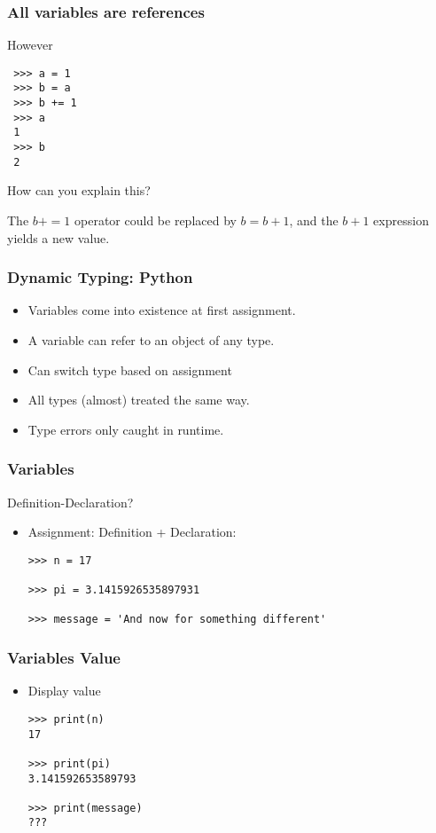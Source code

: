 
 \begin{frame}[fragile]
   \frametitle{All variables are references}
   
However

 \begin{lstlisting}
 >>> a = 1
 >>> b = a
 >>> b += 1
 >>> a
 1
 >>> b
 2
 \end{lstlisting}

     How can you explain this?

     The $b += 1$ operator could be replaced by    $b = b + 1$, and the $b+1$ expression yields a
       new value.

 \end{frame}


\begin{frame}[fragile]\frametitle{Dynamic Typing: Python}
  \begin{itemize}
  \item Variables come into existence at first assignment.
  \item A variable can refer to an object of any type.
\item Can switch type based on assignment
  \item All types (almost) treated the same way.
  \item Type errors only caught in runtime.
    \end{itemize}

\end{frame}


\begin{frame}[fragile]\frametitle{Variables}
Definition-Declaration?
\begin{itemize}
\item  Assignment: Definition + Declaration:
\begin{lstlisting}
>>> n = 17

>>> pi = 3.1415926535897931

>>> message = 'And now for something different'
\end{lstlisting}
\end{itemize}
\end{frame}

\begin{frame}[fragile]\frametitle{Variables Value}
\begin{itemize}
\item Display value
\begin{lstlisting}
>>> print(n)
17

>>> print(pi)
3.141592653589793

>>> print(message)
???
\end{lstlisting}
\end{itemize}
\end{frame}


